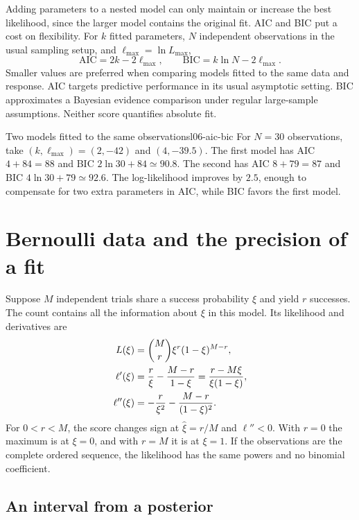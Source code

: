 Adding parameters to a nested model can only maintain or increase the best likelihood, since the larger model contains the original fit. AIC and BIC put a cost on flexibility. For $k$ fitted parameters, $N$ independent observations in the usual sampling setup, and $\ell_{\max}=\ln L_{\max}$,
\begin{equation}
 \mathrm{AIC}=2k-2\ell_{\max},\qquad
 \mathrm{BIC}=k\ln N-2\ell_{\max}.
 \label{eq:l06-aic-bic}
\end{equation}
Smaller values are preferred when comparing models fitted to the same data and response. AIC targets predictive performance in its usual asymptotic setting. BIC approximates a Bayesian evidence comparison under regular large-sample assumptions. Neither score quantifies absolute fit.

\begin{example}{Two models fitted to the same observations}{l06-aic-bic}
For $N=30$ observations, take $(k,\ell_{\max})=(2,-42)$ and $(4,-39.5)$. The first model has AIC $4+84=88$ and BIC $2\ln 30+84\simeq90.8$. The second has AIC $8+79=87$ and BIC $4\ln 30+79\simeq92.6$. The log-likelihood improves by $2.5$, enough to compensate for two extra parameters in AIC, while BIC favors the first model.
\end{example}

\section{Bernoulli data and the precision of a fit}
\label{sec:l06-bernoulli}

Suppose $M$ independent trials share a success probability $\xi$ and yield $r$ successes. The count contains all the information about $\xi$ in this model. Its likelihood and derivatives are
\begin{align}
 L(\xi)&=\binom{M}{r}\xi^r(1-\xi)^{M-r},
 \label{eq:l06-binomial-likelihood}\\
 \ell'(\xi)&=\frac{r}{\xi}-\frac{M-r}{1-\xi}
            =\frac{r-M\xi}{\xi(1-\xi)},\notag\\
 \ell''(\xi)&=-\frac{r}{\xi^2}-\frac{M-r}{(1-\xi)^2}.
 \label{eq:l06-binomial-curvature}
\end{align}
For $0<r<M$, the score changes sign at $\widehat\xi=r/M$ and $\ell''<0$. With $r=0$ the maximum is at $\xi=0$, and with $r=M$ it is at $\xi=1$. If the observations are the complete ordered sequence, the likelihood has the same powers and no binomial coefficient.

\subsection{An interval from a posterior}
\label{subsec:l06-binomial-posterior}

